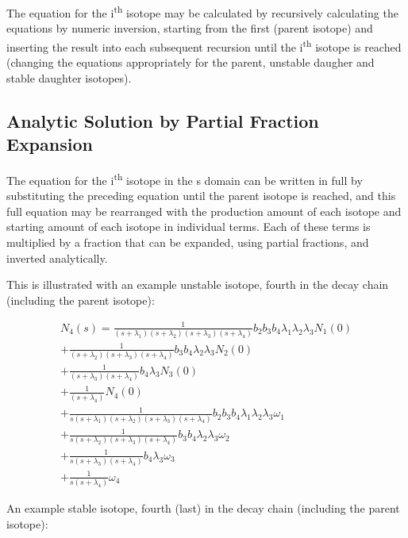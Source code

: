 The equation for the i\textsuperscript{th} isotope may be calculated by recursively calculating the equations by numeric inversion, starting from the first (parent isotope) and inserting the result into each subsequent recursion until the i\textsuperscript{th} isotope is reached (changing the equations appropriately for the parent, unstable daugher and stable daughter isotopes).


\subsection{Analytic Solution by Partial Fraction Expansion}

The equation for the i\textsuperscript{th} isotope in the s domain can be written in full by substituting the preceding equation until the parent isotope is reached, and this full equation may be rearranged with the production amount of each isotope and starting amount of each isotope in individual terms.  Each of these terms is multiplied by a fraction that can be expanded, using partial fractions, and inverted analytically.

This is illustrated with an example unstable isotope, fourth in the decay chain (including the parent isotope):

\begin{equation}
\begin{split}
N_{4}(s) =
\frac{1}{(s+\lambda_1)(s+\lambda_2)(s+\lambda_3)(s+\lambda_4)} b_{2} b_{3} b_{4} \lambda_1 \lambda_2 \lambda_3 N_{1}(0) \\
+ \frac{1}{(s+\lambda_2)(s+\lambda_3)(s+\lambda_4)} b_{3} b_{4} \lambda_2 \lambda_3 N_{2}(0) \\
+ \frac{1}{(s+\lambda_3)(s+\lambda_4)} b_{4} \lambda_3 N_{3}(0) \\
+ \frac{1}{(s+\lambda_4)} N_{4}(0) \\
+ \frac{1}{s(s+\lambda_1)(s+\lambda_2)(s+\lambda_3)(s+\lambda_4)} b_{2} b_{3} b_{4} \lambda_1 \lambda_2 \lambda_3 \omega_{1} \\
+ \frac{1}{s(s+\lambda_2)(s+\lambda_3)(s+\lambda_4)} b_{3} b_{4} \lambda_2 \lambda_3 \omega_{2} \\
+ \frac{1}{s(s+\lambda_3)(s+\lambda_4)} b_{4} \lambda_3 \omega_{3} \\
+ \frac{1}{s(s+\lambda_4)} \omega_{4}
\end{split}
\end{equation}

An example stable isotope, fourth (last) in the decay chain (including the parent isotope):


